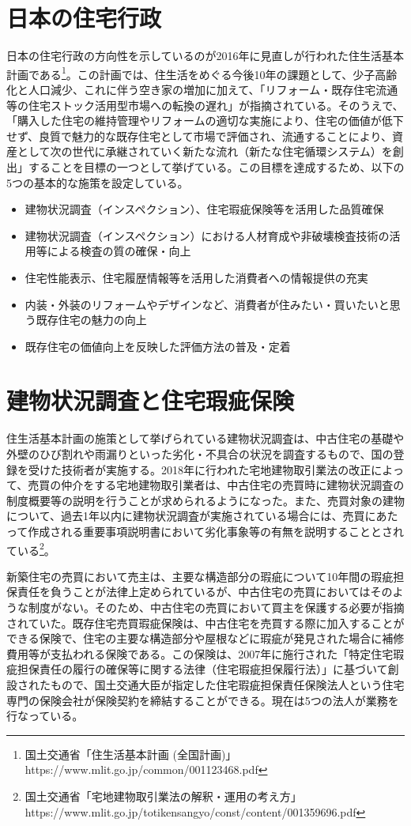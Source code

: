 \documentclass[a4paper,fontsize=11pt,report,notitlepage,line_length=38zw,number_of_lines=40]{jlreq}
\begin{document}
\section{日本の住宅行政}
日本の住宅行政の方向性を示しているのが2016年に見直しが行われた住生活基本計画である\footnote{国土交通省「住生活基本計画 (全国計画)」https://www.mlit.go.jp/common/001123468.pdf}。この計画では、住生活をめぐる今後10年の課題として、少子高齢化と人口減少、これに伴う空き家の増加に加えて、「リフォーム・既存住宅流通等の住宅ストック活用型市場への転換の遅れ」が指摘されている。そのうえで、「購入した住宅の維持管理やリフォームの適切な実施により、住宅の価値が低下せず、良質で魅力的な既存住宅として市場で評価され、流通することにより、資産として次の世代に承継されていく新たな流れ（新たな住宅循環システム）を創出」することを目標の一つとして挙げている。この目標を達成するため、以下の5つの基本的な施策を設定している。
\begin{itemize}
\item 建物状況調査（インスペクション）、住宅瑕疵保険等を活用した品質確保
\item 建物状況調査（インスペクション）における人材育成や非破壊検査技術の活用等による検査の質の確保・向上
\item 住宅性能表示、住宅履歴情報等を活用した消費者への情報提供の充実
\item 内装・外装のリフォームやデザインなど、消費者が住みたい・買いたいと思う既存住宅の魅力の向上
\item 既存住宅の価値向上を反映した評価方法の普及・定着
\end{itemize}

\section{建物状況調査と住宅瑕疵保険}
住生活基本計画の施策として挙げられている建物状況調査は、中古住宅の基礎や外壁のひび割れや雨漏りといった劣化・不具合の状況を調査するもので、国の登録を受けた技術者が実施する。2018年に行われた宅地建物取引業法の改正によって、売買の仲介をする宅地建物取引業者は、中古住宅の売買時に建物状況調査の制度概要等の説明を行うことが求められるようになった。また、売買対象の建物について、過去1年以内に建物状況調査が実施されている場合には、売買にあたって作成される重要事項説明書において劣化事象等の有無を説明することとされている\footnote{国土交通省「宅地建物取引業法の解釈・運用の考え方」https://www.mlit.go.jp/totikensangyo/const/content/001359696.pdf}。

新築住宅の売買において売主は、主要な構造部分の瑕疵について10年間の瑕疵担保責任を負うことが法律上定められているが、中古住宅の売買においてはそのような制度がない。そのため、中古住宅の売買において買主を保護する必要が指摘されていた。既存住宅売買瑕疵保険は、中古住宅を売買する際に加入することができる保険で、住宅の主要な構造部分や屋根などに瑕疵が発見された場合に補修費用等が支払われる保険である。この保険は、2007年に施行された「特定住宅瑕疵担保責任の履行の確保等に関する法律（住宅瑕疵担保履行法）」に基づいて創設されたもので、国土交通大臣が指定した住宅瑕疵担保責任保険法人という住宅専門の保険会社が保険契約を締結することができる。現在は5つの法人が業務を行なっている。
\end{document}
